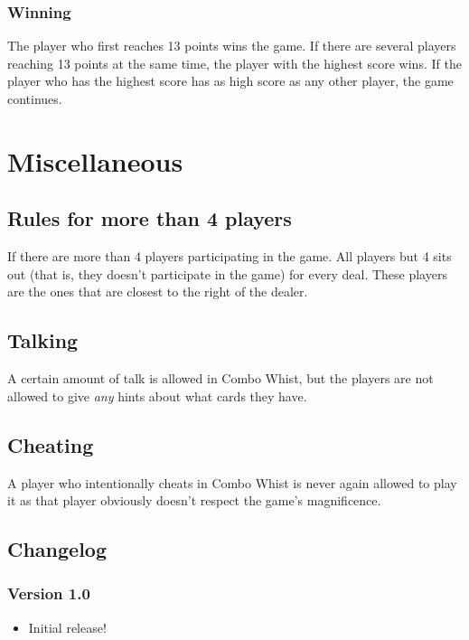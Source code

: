 \documentclass[a4paper]{article}
\begin{document}
			\subsubsection{Winning}
			The player who first reaches 13 points wins the game. If there are several players reaching 13 points at the same time, the player with the highest score wins. If the player who has the highest score has as high score as any other player, the game continues.
			
	\section{Miscellaneous}
		\subsection{Rules for more than 4 players}
		If there are more than 4 players participating in the game. All players but 4 sits out (that is, they doesn't participate in the game) for every deal. These players are the ones that are closest to the right of the dealer.
		
		
		
		\subsection{Talking}
		A certain amount of talk is allowed in Combo Whist, but the players are not allowed to give \emph{any} hints about what cards they have.
		
		\subsection{Cheating}
		A player who intentionally cheats in Combo Whist is never again allowed to play it as that player obviously doesn't respect the game's magnificence.
		
		\subsection{Changelog}
			\subsubsection{Version 1.0}
			\begin{itemize}
				\item Initial release!
			\end{itemize}
\end{document}

